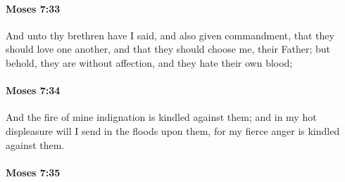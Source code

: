 
		\paragraph{Moses 7:33} %
			\label{MOSES-7-33}

			And unto thy brethren have I said, and also given commandment, that they should love one another, and that they should choose me, their Father; but behold, they are without affection, and they hate their own blood;


		\paragraph{Moses 7:34} %
			\label{MOSES-7-34}

			And the fire of mine indignation is kindled against them; and in my hot displeasure will I send in the floods upon them, for my fierce anger is kindled against them.


		\paragraph{Moses 7:35} %
			\label{MOSES-7-35}

